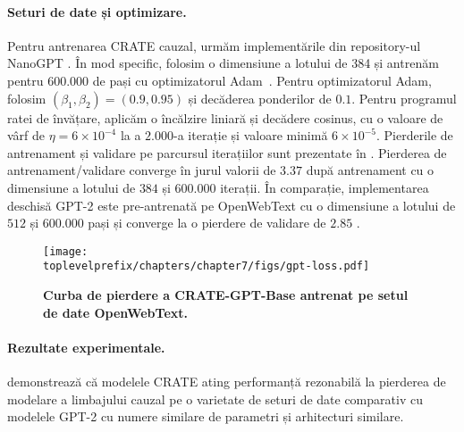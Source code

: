 \documentclass[../../book-main_ro.tex]{subfiles}
\begin{document}
\paragraph{Seturi de date și optimizare.} Pentru antrenarea CRATE cauzal, urmăm implementările din repository-ul NanoGPT \citep{nanogpt}. În mod specific, folosim o dimensiune a lotului de 384 și antrenăm pentru 600.000 de pași cu optimizatorul Adam~\citep{kingma2014adam}. Pentru optimizatorul Adam, folosim $(\beta_1, \beta_2)=(0.9, 0.95)$ și decăderea ponderilor de $0.1$. Pentru programul ratei de învățare, aplicăm o încălzire liniară și decădere cosinus, cu o valoare de vârf de $\eta=6\times 10^{-4}$ la a $2.000$-a iterație și valoare minimă $6\times 10^{-5}$. Pierderile de antrenament și validare pe parcursul iterațiilor sunt prezentate în . Pierderea de antrenament/validare converge în jurul valorii de $3.37$ după antrenament cu o dimensiune a lotului de $384$ și $600.000$ iterații. În comparație, implementarea deschisă GPT-2 este pre-antrenată pe OpenWebText cu o dimensiune a lotului de $512$ și $600.000$ pași și converge la o pierdere de validare de $2.85$ \citep{nanogpt}.

\begin{figure}
    \centering
    \texttt{[image: \\toplevelprefix/chapters/chapter7/figs/gpt-loss.pdf]}
    \caption{\bf Curba de pierdere a CRATE-GPT-Base antrenat pe setul de date OpenWebText.}
    \label{fig:crate-text-evals}
\end{figure}

\paragraph{Rezultate experimentale.}

 demonstrează că modelele CRATE ating performanță rezonabilă la pierderea de modelare a limbajului cauzal pe o varietate de seturi de date comparativ cu modelele GPT-2 cu numere similare de parametri și arhitecturi similare.
\end{document}
